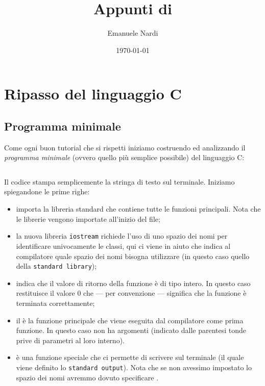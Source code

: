 \documentclass[class=article, crop=false, 12pt]{standalone}
\title{Appunti di {\Cpp}}
\author{Emanuele Nardi}
\date{\today}
\begin{document}
\maketitle

\thispagestyle{empty}
\tableofcontents
\clearpage

\section{Ripasso del linguaggio C}

\subsection{Programma minimale}

Come ogni buon tutorial che si rispetti iniziamo costruendo ed analizzando il \emph{programma minimale} (ovvero quello più semplice possibile) del linguaggio C:

\inputminted{cpp}{assets/codes/cpp/ESEMPI_BASE/hello-world.cc}

Il codice stampa semplicemente la stringa  di testo  sul terminale.
Iniziamo spiegandone le prime righe:
\begin{itemize}
	\item {} importa la libreria standard che contiene tutte le funzioni principali. Nota che le librerie vengono importate all'inizio del file;
	\item la nuova libreria \texttt{iostream} richiede l'uso di uno spazio dei nomi per identificare univocamente le classi, qui ci viene in aiuto  che indica al compilatore quale spazio dei nomi bisogna utilizzare (in questo caso quello della \texttt{standard library});
	\item {} indica che il valore di ritorno della funzione è di tipo intero. In questo caso restituisce il valore \textsf{0} che --- per convenzione --- significa che la funzione è terminata correttamente;
	\item il  è la funzione principale che viene eseguita dal compilatore come prima funzione. In questo caso non ha argomenti (indicato dalle parentesi tonde prive di parametri al loro interno).
	\item {} è una funzione speciale che ci permette di scrivere sul terminale (il quale viene definito lo \texttt{standard output}). Nota che se non avessimo impostato lo spazio dei nomi avremmo dovuto specificare .
\end{itemize}
\end{document}
